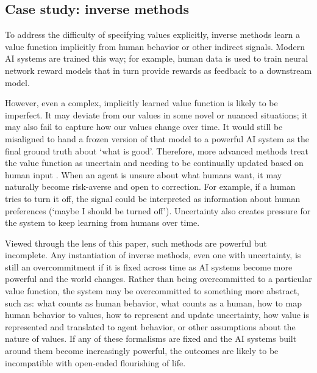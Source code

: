 \documentclass[12pt]{article}
\begin{document}
\subsection{Case study: inverse methods}

To address the difficulty of specifying values explicitly, inverse methods learn a value function implicitly from human behavior or other indirect signals. Modern AI systems are trained this way; for example, human data is used to train neural network reward models that in turn provide rewards as feedback to a downstream model.

However, even a complex, implicitly learned value function is likely to be imperfect. It may deviate from our values in some novel or nuanced situations; it may also fail to capture how our values change over time. It would still be misaligned to hand a frozen version of that model to a powerful AI system as the final ground truth about `what is good'. Therefore, more advanced methods treat the value function as uncertain and needing to be continually updated based on human input \citep{russell2019human, hadfieldmenell2017off, hadfieldmenell2016cooperative, shah2020benefits, jeon2020reward}. When an agent is unsure about what humans want, it may naturally become risk-averse and open to correction. For example, if a human tries to turn it off, the signal could be interpreted as information about human preferences (`maybe I should be turned off'). Uncertainty also creates pressure for the system to keep learning from humans over time.

Viewed through the lens of this paper, such methods are powerful but incomplete. Any instantiation of inverse methods, even one with uncertainty, is still an overcommitment if it is fixed across time as AI systems become more powerful and the world changes. Rather than being overcommitted to a particular value function, the system may be overcommitted to something more abstract, such as: what counts as human behavior, what counts as a human, how to map human behavior to values, how to represent and update uncertainty, how value is represented and translated to agent behavior, or other assumptions about the nature of values. If any of these formalisms are fixed and the AI systems built around them become increasingly powerful, the outcomes are likely to be incompatible with open-ended flourishing of life.

\end{document}
